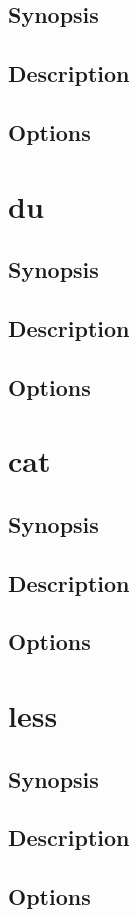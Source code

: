 \documentclass[a4paper, 10pt, onecolumn, openright, oneside]{book}
\begin{document}
			\subsection{Synopsis}
			\subsection{Description}
			\subsection{Options}
		\section{du}
			\subsection{Synopsis}
			\subsection{Description}
			\subsection{Options}
		\section{cat}
			\subsection{Synopsis}
			\subsection{Description}
			\subsection{Options}
		\section{less}
			\subsection{Synopsis}
			\subsection{Description}
			\subsection{Options}
\end{document}
